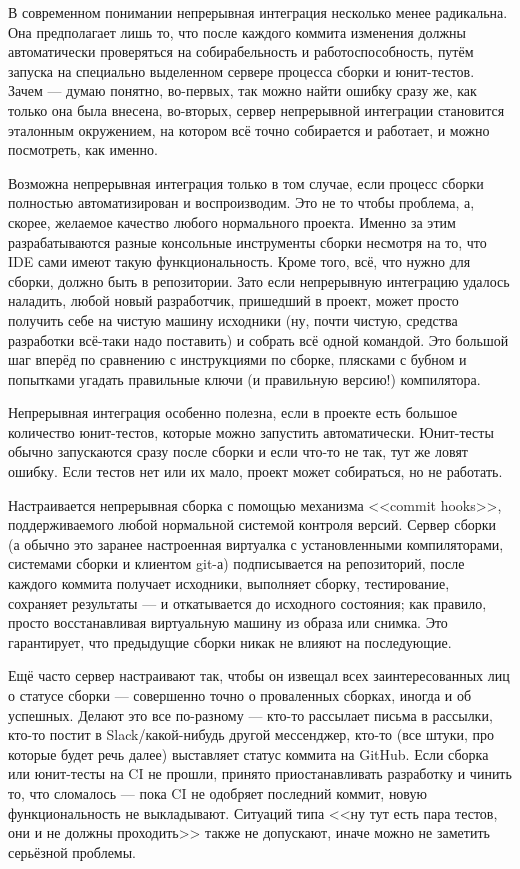 \documentclass[a5paper]{article}
\begin{document}
В современном понимании непрерывная интеграция несколько менее радикальна. Она предполагает лишь то, что после каждого коммита изменения должны автоматически проверяться на собирабельность и работоспособность, путём запуска на специально выделенном сервере процесса сборки и юнит-тестов. Зачем --- думаю понятно, во-первых, так можно найти ошибку сразу же, как только она была внесена, во-вторых, сервер непрерывной интеграции становится эталонным окружением, на котором всё точно собирается и работает, и можно посмотреть, как именно. 

Возможна непрерывная интеграция только в том случае, если процесс сборки полностью автоматизирован и воспроизводим. Это не то чтобы проблема, а, скорее, желаемое качество любого нормального проекта. Именно за этим разрабатываются разные консольные инструменты сборки несмотря на то, что IDE сами имеют такую функциональность. Кроме того, всё, что нужно для сборки, должно быть в репозитории. Зато если непрерывную интеграцию удалось наладить, любой новый разработчик, пришедший в проект, может просто получить себе на чистую машину исходники (ну, почти чистую, средства разработки всё-таки надо поставить) и собрать всё одной командой. Это большой шаг вперёд по сравнению с инструкциями по сборке, плясками с бубном и попытками угадать правильные ключи (и правильную версию!) компилятора.

Непрерывная интеграция особенно полезна, если в проекте есть большое количество юнит-тестов, которые можно запустить автоматически. Юнит-тесты обычно запускаются сразу после сборки и если что-то не так, тут же ловят ошибку. Если тестов нет или их мало, проект может собираться, но не работать.

Настраивается непрерывная сборка с помощью механизма <<commit hooks>>, поддерживаемого любой нормальной системой контроля версий. Сервер сборки (а обычно это заранее настроенная виртуалка с установленными компиляторами, системами сборки и клиентом git-а) подписывается на репозиторий, после каждого коммита получает исходники, выполняет сборку, тестирование, сохраняет результаты --- и откатывается до исходного состояния; как правило, просто восстанавливая виртуальную машину из образа или снимка. Это гарантирует, что предыдущие сборки никак не влияют на последующие.

Ещё часто сервер настраивают так, чтобы он извещал всех заинтересованных лиц о статусе сборки --- совершенно точно о проваленных сборках, иногда и об успешных. Делают это все по-разному --- кто-то рассылает письма в рассылки, кто-то постит в Slack/какой-нибудь другой мессенджер, кто-то (все штуки, про которые будет речь далее) выставляет статус коммита на GitHub. Если сборка или юнит-тесты на CI не прошли, принято приостанавливать разработку и чинить то, что сломалось --- пока CI не одобряет последний коммит, новую функциональность не выкладывают. Ситуаций типа <<ну тут есть пара тестов, они и не должны проходить>> также не допускают, иначе можно не заметить серьёзной проблемы.
\end{document}
